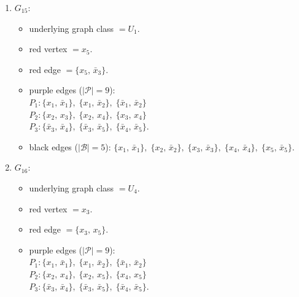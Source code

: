 \begin{enumerate}[leftmargin=*]
\begin{itemize}[leftmargin=*]
\item purple edges ($|\mathcal{P}|=9$):\mbox{}\\
$P_{1}: \{x_{1},\,\bar{x}_{1}\},\; \{x_{1},\,\bar{x}_{2}\},\; \{\bar{x}_{1},\,\bar{x}_{2}\}$\\
$P_{2}: \{x_{2},\,x_{3}\},\; \{x_{2},\,x_{5}\},\; \{x_{3},\,x_{5}\}$\\
$P_{3}: \{\bar{x}_{3},\,\bar{x}_{4}\},\; \{\bar{x}_{3},\,\bar{x}_{5}\},\; \{\bar{x}_{4},\,\bar{x}_{5}\}$.
\item black edges ($|\mathcal{B}|=5$): $\{x_{1},\,\bar{x}_{1}\},\; \{x_{2},\,\bar{x}_{2}\},\; \{x_{3},\,\bar{x}_{3}\},\; \{x_{4},\,\bar{x}_{4}\},\; \{x_{5},\,\bar{x}_{5}\}$.
\end{itemize}
\item $G_{15}$:
\begin{itemize}[leftmargin=*]
\item underlying graph class $= U_1$.
\item red vertex $= x_{5}$.
\item red edge $= \{x_{5},\,\bar{x}_{3}\}$.
\item purple edges ($|\mathcal{P}|=9$):\mbox{}\\
$P_{1}: \{x_{1},\,\bar{x}_{1}\},\; \{x_{1},\,\bar{x}_{2}\},\; \{\bar{x}_{1},\,\bar{x}_{2}\}$\\
$P_{2}: \{x_{2},\,x_{3}\},\; \{x_{2},\,x_{4}\},\; \{x_{3},\,x_{4}\}$\\
$P_{3}: \{\bar{x}_{3},\,\bar{x}_{4}\},\; \{\bar{x}_{3},\,\bar{x}_{5}\},\; \{\bar{x}_{4},\,\bar{x}_{5}\}$.
\item black edges ($|\mathcal{B}|=5$): $\{x_{1},\,\bar{x}_{1}\},\; \{x_{2},\,\bar{x}_{2}\},\; \{x_{3},\,\bar{x}_{3}\},\; \{x_{4},\,\bar{x}_{4}\},\; \{x_{5},\,\bar{x}_{5}\}$.
\end{itemize}
\item $G_{16}$:
\begin{itemize}[leftmargin=*]
\item underlying graph class $= U_4$.
\item red vertex $= x_{3}$.
\item red edge $= \{x_{3},\,x_{5}\}$.
\item purple edges ($|\mathcal{P}|=9$):\mbox{}\\
$P_{1}: \{x_{1},\,\bar{x}_{1}\},\; \{x_{1},\,\bar{x}_{2}\},\; \{\bar{x}_{1},\,\bar{x}_{2}\}$\\
$P_{2}: \{x_{2},\,x_{4}\},\; \{x_{2},\,x_{5}\},\; \{x_{4},\,x_{5}\}$\\
$P_{3}: \{\bar{x}_{3},\,\bar{x}_{4}\},\; \{\bar{x}_{3},\,\bar{x}_{5}\},\; \{\bar{x}_{4},\,\bar{x}_{5}\}$.

\end{itemize}
\end{enumerate}
